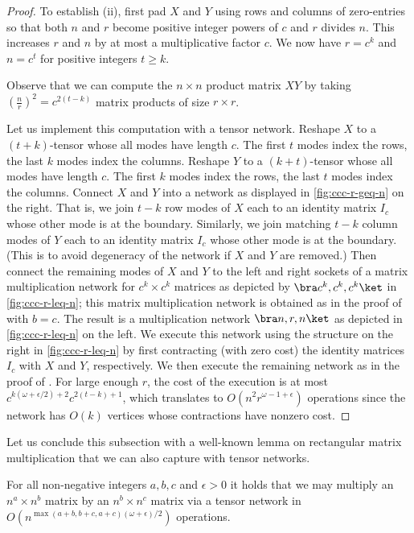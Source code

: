 \begin{proof}
To establish (ii), first pad $X$ and $Y$ using rows and columns
of zero-entries so that both $n$ and $r$
become positive integer powers of $c$ and $r$ divides $n$.
This increases $r$ and $n$ by at most a multiplicative factor $c$.
We now have $r=c^k$ and $n=c^t$ for positive integers $t\geq k$.

Observe that we can compute the $n\times n$ product matrix $XY$ by
taking $(\frac{n}{r})^2=c^{2(t-k)}$ matrix products of
size $r\times r$.

Let us implement this computation with a tensor network.
Reshape
$X$ to a $(t+k)$-tensor whose all modes have length $c$.
The first $t$ modes index the rows, the last $k$ modes index the columns.
Reshape
$Y$ to a $(k+t)$-tensor whose all modes have length $c$. The first $k$ modes
index the rows, the last $t$ modes index the columns.
Connect $X$ and $Y$ into a network as displayed in \eqref{fig:ccc-r-geq-n}
on the right.
That is, we join $t-k$ row modes of $X$ each to an identity matrix $I_c$
whose other mode is at the boundary. Similarly, we join matching $t-k$
column modes of $Y$ each to an identity matrix $I_c$ whose other mode
is at the boundary.
(This is to avoid degeneracy of the network if $X$ and $Y$ are removed.)
Then connect the remaining modes of $X$ and $Y$
to the left and right sockets of a matrix multiplication network
for $c^k\times c^k$ matrices as depicted by $\bra c^k,c^k,c^k\ket$
in \eqref{fig:ccc-r-leq-n}; this matrix multiplication network is obtained
as in the proof of  with $b=c$. The result is a multiplication
network $\bra n,r,n\ket$ as depicted in \eqref{fig:ccc-r-leq-n} on the left.
We execute this network using the structure on the right in
\eqref{fig:ccc-r-leq-n} by first
contracting (with zero cost)
the identity matrices $I_c$ with $X$ and $Y$, respectively.
We then execute the remaining network as in the proof
of .
For large enough $r$, the cost of the execution is at most
$c^{k(\omega+\epsilon/2)+2}c^{2(t-k)+1}$, which translates to
$O(n^2r^{\omega-1+\epsilon})$ operations since the network
has $O(k)$ vertices whose contractions have nonzero cost.
\end{proof}

Let us conclude this subsection with a well-known lemma on rectangular
matrix multiplication that we can also capture with tensor networks.

\begin{lemma}
  \label{lem:general rectangular mul}
  For all non-negative integers $a,b,c$ and $\epsilon > 0$
  it holds that we may multiply an $n^a \times n^b$ matrix by an
  $n^b\times n^c$ matrix via a tensor network in
  $O(n^{\max(a+b,b+c,a+c) (\omega + \epsilon) / 2})$ operations.

\end{lemma}

